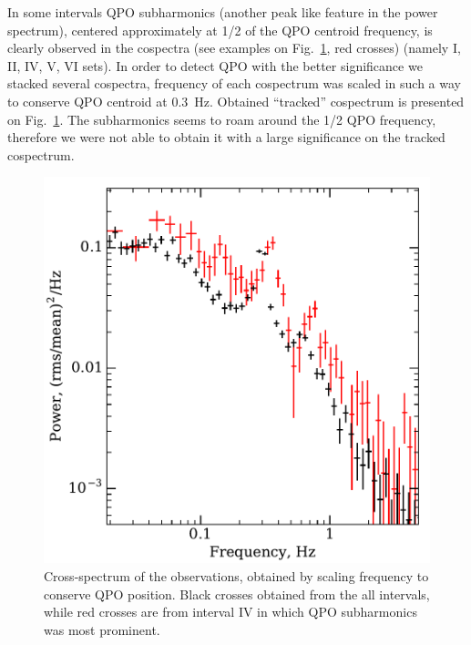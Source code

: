 \documentclass[a4paper,fleqn,usenatbib]{mnras}
\begin{document}
In some intervals QPO subharmonics (another peak like feature in the power spectrum), centered approximately at 1/2 of the QPO centroid frequency, is clearly observed in the cospectra (see examples on Fig.~\ref{fig:cospec_tracked}, red crosses) (namely I, II, IV, V, VI sets).
In order to detect QPO with the better significance we stacked several cospectra, frequency of each cospectrum was scaled in such a way to conserve QPO centroid at 0.3~Hz.
Obtained ``tracked'' cospectrum is presented on Fig.~\ref{fig:cospec_tracked}.
The subharmonics seems to roam around the 1/2 QPO frequency, therefore we were not able to obtain it with a large significance on the tracked cospectrum.


\begin{figure}
        \includegraphics[width=\columnwidth]{subharmonics2.pdf}
        \caption{Cross-spectrum of the observations, obtained by scaling frequency to conserve QPO position.
        Black crosses obtained from the all intervals, while red crosses are from interval IV in which QPO subharmonics was most prominent.}
        \label{fig:cospec_tracked}
\end{figure}
\end{document}
